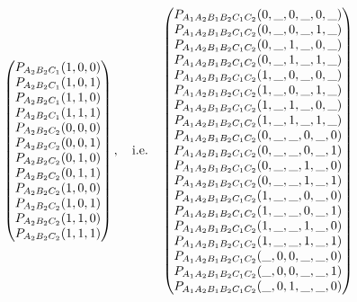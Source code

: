 \documentclass[aps,english,superscriptaddress,onecolumn,twoside,longbibliography,pra,floatfix,fleqn,nofootinbib]{revtex4-1}%
\theoremstyle{definition}
\newcommand{\p}[2][]{{P_{#1}}\parenths{#2}}
\DeclarePairedDelimiter{\parenths}{\lparen}{\rparen}
\begin{document}
\begin{align}
{\begin{pmatrix}
 \p[A_2 B_2 C_1]{1,0,0} \\
 \p[A_2 B_2 C_1]{1,0,1} \\
 \p[A_2 B_2 C_1]{1,1,0} \\
 \p[A_2 B_2 C_1]{1,1,1} \\
 \p[A_2 B_2 C_2]{0,0,0} \\
 \p[A_2 B_2 C_2]{0,0,1} \\
 \p[A_2 B_2 C_2]{0,1,0} \\
 \p[A_2 B_2 C_2]{0,1,1} \\
 \p[A_2 B_2 C_2]{1,0,0} \\
 \p[A_2 B_2 C_2]{1,0,1} \\
 \p[A_2 B_2 C_2]{1,1,0} \\
 \p[A_2 B_2 C_2]{1,1,1} \\
\end{pmatrix},
\quad\text{i.e.}\quad
\begin{pmatrix}
 \p[A_1 A_2 B_1 B_2 C_1 C_2]{0,\_,0,\_,0,\_} \\
 \p[A_1 A_2 B_1 B_2 C_1 C_2]{0,\_,0,\_,1,\_} \\
 \p[A_1 A_2 B_1 B_2 C_1 C_2]{0,\_,1,\_,0,\_} \\
 \p[A_1 A_2 B_1 B_2 C_1 C_2]{0,\_,1,\_,1,\_} \\
 \p[A_1 A_2 B_1 B_2 C_1 C_2]{1,\_,0,\_,0,\_} \\
 \p[A_1 A_2 B_1 B_2 C_1 C_2]{1,\_,0,\_,1,\_} \\
 \p[A_1 A_2 B_1 B_2 C_1 C_2]{1,\_,1,\_,0,\_} \\
 \p[A_1 A_2 B_1 B_2 C_1 C_2]{1,\_,1,\_,1,\_} \\
 \p[A_1 A_2 B_1 B_2 C_1 C_2]{0,\_,\_,0,\_,0} \\
 \p[A_1 A_2 B_1 B_2 C_1 C_2]{0,\_,\_,0,\_,1} \\
 \p[A_1 A_2 B_1 B_2 C_1 C_2]{0,\_,\_,1,\_,0} \\
 \p[A_1 A_2 B_1 B_2 C_1 C_2]{0,\_,\_,1,\_,1} \\
 \p[A_1 A_2 B_1 B_2 C_1 C_2]{1,\_,\_,0,\_,0} \\
 \p[A_1 A_2 B_1 B_2 C_1 C_2]{1,\_,\_,0,\_,1} \\
 \p[A_1 A_2 B_1 B_2 C_1 C_2]{1,\_,\_,1,\_,0} \\
 \p[A_1 A_2 B_1 B_2 C_1 C_2]{1,\_,\_,1,\_,1} \\
 \p[A_1 A_2 B_1 B_2 C_1 C_2]{\_,0,0,\_,\_,0} \\
 \p[A_1 A_2 B_1 B_2 C_1 C_2]{\_,0,0,\_,\_,1} \\
 \p[A_1 A_2 B_1 B_2 C_1 C_2]{\_,0,1,\_,\_,0} \\

\end{pmatrix}}
\end{align}
\end{document}
